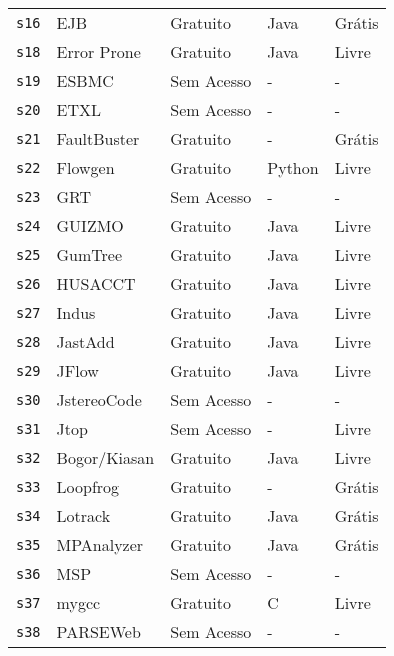 \begin{longtable}{l l l l l}
    \texttt{s16} &
      EJB &
      Gratuito &
      Java &
      Grátis \\
    \texttt{s18} &
      Error Prone &
      Gratuito &
      Java &
      Livre \\
    \texttt{s19} &
      ESBMC &
      Sem Acesso &
      - &
      - \\
    \texttt{s20} &
      ETXL &
      Sem Acesso &
      - &
      - \\
    \texttt{s21} &
      FaultBuster &
      Gratuito &
      - &
      Grátis \\
    \texttt{s22} &
      Flowgen &
      Gratuito &
      Python &
      Livre \\
    \texttt{s23} &
      GRT &
      Sem Acesso &
      - &
      - \\
    \texttt{s24} &
      GUIZMO &
      Gratuito &
      Java &
      Livre \\
    \texttt{s25} &
      GumTree &
      Gratuito &
      Java &
      Livre \\
    \texttt{s26} &
      HUSACCT &
      Gratuito &
      Java &
      Livre \\
    \texttt{s27} &
      Indus &
      Gratuito &
      Java &
      Livre \\
    \texttt{s28} &
      JastAdd &
      Gratuito &
      Java &
      Livre \\
    \texttt{s29} &
      JFlow &
      Gratuito &
      Java &
      Livre \\
    \texttt{s30} &
      JstereoCode &
      Sem Acesso &
      - &
      - \\
    \texttt{s31} &
      Jtop &
      Sem Acesso &
      - &
      Livre \\
    \texttt{s32} &
      Bogor/Kiasan &
      Gratuito &
      Java &
      Livre \\
    \texttt{s33} &
      Loopfrog &
      Gratuito &
      - &
      Grátis \\
    \texttt{s34} &
      Lotrack &
      Gratuito &
      Java &
      Grátis \\
    \texttt{s35} &
      MPAnalyzer &
      Gratuito &
      Java &
      Grátis \\
    \texttt{s36} &
      MSP &
      Sem Acesso &
      - &
      - \\
    \texttt{s37} &
      mygcc &
      Gratuito &
      C &
      Livre \\
    \texttt{s38} &
      PARSEWeb &
      Sem Acesso &
      - &
      - \\

\end{longtable}
